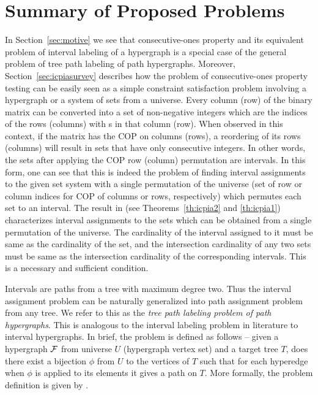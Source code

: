 \section[Summary of problems]{Summary of Proposed Problems}
\label{sec:myresearchintro}
In Section~\ref{sec:motive} we see that consecutive-ones property and
its equivalent problem of interval labeling of a hypergraph is a
special case of the general problem of tree path labeling of path
hypergraphs. Moreover, Section~\ref{sec:icpiasurvey} describes how the
problem of consecutive-ones property testing can be easily seen as a
simple constraint satisfaction problem involving a hypergraph or a
system of sets from a universe. Every column (row) of the binary
matrix can be converted into a set of non-negative integers which are
the indices of the rows (columns) with {\un}s in that column
(row). When observed in this context, if the matrix has the COP on
columns (rows), a reordering of its rows (columns) will result in sets
that have only consecutive integers. In other words, the sets after
applying the COP row (column) permutation are intervals.  In this
form, one can see that this is indeed the problem of finding interval
assignments to the given set system with a single permutation of the
universe (set of row or column indices for COP of columns or rows,
respectively) which permutes each set to an interval. The result in
\cite{nsnrs09} (see Theorems~\ref{th:icpia2} and \ref{th:icpia1})
characterizes interval assignments to the sets which can be obtained
from a single permutation of the universe. The cardinality of the
interval assigned to it must be same as the cardinality of the set,
and the intersection cardinality of any two sets must be same as the
intersection cardinality of the corresponding intervals. This is a
necessary and sufficient condition.

Intervals are paths from a tree with maximum degree two. Thus the
interval assignment problem can be naturally generalized into path
assignment problem from any tree. We refer to this as the {\em tree
  path labeling problem of path hypergraphs}. This is analogous to the
interval labeling problem in literature \cite{kklv10} to interval
hypergraphs. In brief, the problem is defined as follows -- given a
hypergraph ${\cal F}$ from universe $U$ (\ie hypergraph vertex set) and a
target tree $T$, does there exist a bijection $\phi$ from $U$ to the
vertices of $T$ such that for each hyperedge when $\phi$ is applied to
its elements it gives a path on $T$.  More formally, the problem
definition is given by \CFTPL.

